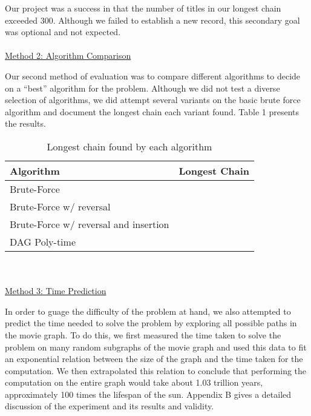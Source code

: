 \documentclass[11pt,english]{article}
\begin{document}
Our project was a success in that the number of titles in our longest
chain exceeded 300. Although we failed to establish a new record, this
secondary goal was optional and not expected.\\\\
\underline{Method 2: Algorithm Comparison}

Our second method of evaluation was to compare different algorithms to
decide on a ``best'' algorithm for the problem. Although we did not test a
diverse selection of algorithms, we did attempt several variants on the basic
brute force algorithm and document the longest chain each variant found. Table
1 presents the results.
\begin{table}
\centering
\begin{tabular}{l|c}
Algorithm                               & Longest Chain \\
\hline
Brute-Force                             &               \\
Brute-Force w/ reversal                 &               \\
Brute-Force w/ reversal and insertion   &               \\
DAG Poly-time                           &               \\
\end{tabular}
\caption{Longest chain found by each algorithm}
\vspace{-8mm}
\label{tab:algos}
\end{table}
\\\\
\underline{Method 3: Time Prediction}

In order to guage the difficulty of the problem at hand, we also attempted to
predict the time needed to solve the problem by exploring all possible paths
in the movie graph. To do this, we first measured the time taken to solve the
problem on many random subgraphs of the movie graph and used this data to fit
an exponential relation between the size of the graph and the time taken for
the computation. We then extrapolated this relation to conclude that performing
the computation on the entire graph would take about 1.03 trillion years,
approximately 100 times the lifespan of the sun. Appendix B gives a detailed
discussion of the experiment and its results and validity.
\end{document}
